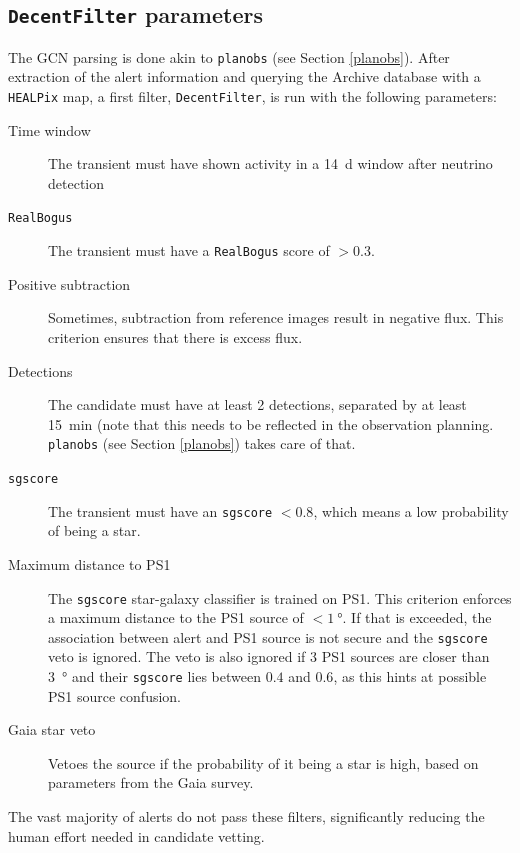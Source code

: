 \documentclass[
    a4paper, %
    fontsize=10pt, %
    twoside=true, %
    numbers=noenddot, %
    fontmethod=tex,
]{kaobook}
\begin{document}
\subsection{\texttt{DecentFilter} parameters}
The GCN parsing is done akin to \texttt{planobs} (see Section \ref{planobs}). After extraction of the alert information and querying the Archive database with a \texttt{HEALPix} map, a first filter, \texttt{DecentFilter}, is run with the following parameters:
\begin{description}
    \item[Time window] The transient must have shown activity in a \SI{14}{\day} window after neutrino detection
    \item[\texttt{RealBogus}] The transient must have a \texttt{RealBogus} score of $>0.3$.
    \item[Positive subtraction] Sometimes, subtraction from reference images result in negative flux. This criterion ensures that there is excess flux.
    \item[Detections] The candidate must have at least 2 detections, separated by at least \SI{15}{\minute} (note that this needs to be reflected in the observation planning. \texttt{planobs} (see Section \ref{planobs}) takes care of that.
    \item[\texttt{sgscore}] The transient must have an \texttt{sgscore} $<0.8$, which means a low probability of being a star.
    \item[Maximum distance to PS1] The \texttt{sgscore} star-galaxy classifier is trained on PS1. This criterion enforces a maximum distance to the PS1 source of $<\SI{1}{\degree}$. If that is exceeded, the association between alert and PS1 source is not secure and the \texttt{sgscore} veto is ignored. The veto is also ignored if 3 PS1 sources are closer than \SI{3}{\degree} and their \texttt{sgscore} lies between $0.4$ and $0.6$, as this hints at possible PS1 source confusion.
    \item[Gaia star veto] Vetoes the source if the probability of it being a star is high, based on parameters from the Gaia survey.
\end{description}
The vast majority of alerts do not pass these filters, significantly reducing the human effort needed in candidate vetting. 
\end{document}

